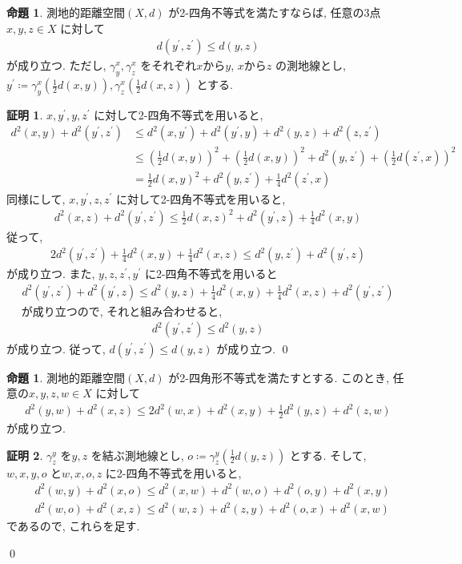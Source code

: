 \documentclass[10pt, fleqn, label-section=none]{bxjsarticle}
\theoremstyle{definition}
\newtheorem{prop}[dfn]{命題}
\newtheorem*{pf*}{証明}
\renewcommand{\;}{\, ; \,}
\begin{document}
\begin{prop}測地的距離空間$(X, d)$ が2-四角不等式を満たすならば, 任意の3点$x, y, z \in X$ に対して
\begin{align*} d(y^\prime, z^\prime) \leq d(y, z)\end{align*}
が成り立つ. 
ただし, $\gamma_y^x, \gamma_z^x$ をそれぞれ$x$から$y$, $x$から$z$ の測地線とし, $y^\prime \coloneqq \gamma_y^x(\frac{1}{2}d(x,y)), \gamma_z^x(\frac{1}{2}d(x,z))$ とする. 
\end{prop}
\begin{pf*}$x, y^\prime, y, z^\prime$ に対して2-四角不等式を用いると, 
\begin{align*} d^2(x,y ) + d^2(y^\prime, z^\prime ) &\leq d^2(x, y^\prime) + d^2( y^\prime, y)  + d^2(y, z) + d^2(z, z^\prime) 
\\ &\leq (\frac{1}{2}d(x,y))^2 + (\frac{1}{2}d(x,y))^2 + d^2(y, z^\prime) + (\frac{1}{2}d(z^\prime ,x))^2 
\\& =  \frac{1}{2}d(x,y)^2 + d^2(y, z^\prime) + \frac{1}{4}d^2(z^\prime ,x) \end{align*}
同様にして, $x, y^\prime, z, z^\prime$ に対して2-四角不等式を用いると, 
\begin{align*} d^2(x,z) + d^2(y^\prime, z^\prime) \leq \frac{1}{2}d(x, z)^2 + d^2(y^\prime , z) + \frac{1}{4}d^2(x ,y) \end{align*}
従って, 
\begin{align*} 2d^2(y^\prime, z^\prime) + \frac{1}{4}d^2(x, y) + \frac{1}{4} d^2(x, z) \leq d^2(y, z^\prime) + d^2(y^\prime, z) \end{align*}
が成り立つ. また, $y, z, z^\prime, y^\prime$ に2-四角不等式を用いると
\begin{align*} d^2(y^\prime, z^\prime) + d^2(y^\prime, z) \leq d^2(y, z) + \frac{1}{4}d^2(x, y) + \frac{1}{4}d^2(x, z) + d^2(y^\prime, z^\prime) \end{align*}　
が成り立つので, それと組み合わせると, 
\begin{align*} d^2(y^\prime, z^\prime) \leq d^2(y, z) \end{align*}
が成り立つ. 従って, $d(y^\prime, z^\prime) \leq d(y, z)$ が成り立つ. 
\qed
\end{pf*}

\begin{prop}測地的距離空間$(X, d)$ が2-四角形不等式を満たすとする. このとき, 任意の$x, y, z, w \in X$ に対して
\begin{align*} d^2(y, w)  + d^2(x, z) \leq 2 d^2(w, x) + d^2(x, y) + \frac{1}{2} d^2(y, z) + d^2(z, w)                       \end{align*}
が成り立つ. 
\end{prop}
\begin{pf*}$\gamma_z^y$ を$y, z$ を結ぶ測地線とし, $o \coloneqq \gamma_z^y (\frac{1}{2} d(y, z))$ とする. そして, $w, x, y, o$ と$w, x, o, z$ に2-四角不等式を用いると, 
\begin{align*}
&d^2(w, y) + d^2(x, o) \leq d^2(x, w) + d^2(w, o) + d^2(o, y) + d^2(x, y)
\\&d^2(w, o) + d^2(x, z) \leq d^2(w,z) + d^2(z, y) + d^2(o, x) + d^2(x, w)
 \end{align*}
であるので, これらを足す. 

\qed
\end{pf*}
\end{document}
